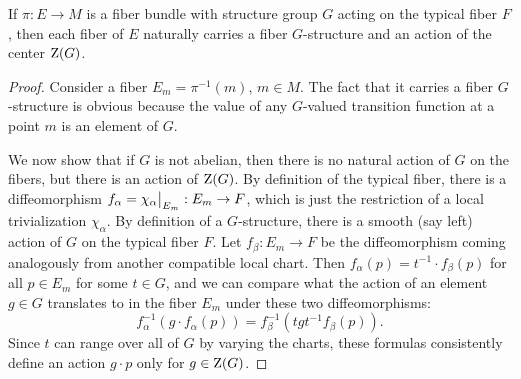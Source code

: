 \begin{prop}
    If $\pi:E\to M$ is a fiber bundle with structure group $G$ acting on the typical fiber $F$, then each fiber of $E$ naturally carries a fiber $G$-structure and an action of the center $\mathrm{Z}(G)$.
\end{prop}
\begin{proof}
    Consider a fiber $E_m=\pi^{-1}(m)$, $m\in M$. The fact that it carries a fiber $G$-structure is obvious because the value of any $G$-valued transition function at a point $m$ is an element of $G$. 
    
    We now show that if $G$ is not abelian, then there is no natural action of $G$ on the fibers, but there is an action of $\mathrm{Z}(G)$. By definition of the typical fiber, there is a diffeomorphism $f_\alpha=\restr{\chi_\alpha}{E_m}:E_m\to F$, which is just the restriction of a local trivialization $\chi_\alpha$. By definition of a $G$-structure, there is a smooth (say left) action of $G$ on the typical fiber $F$. Let $f_\beta:E_m\to F$ be the diffeomorphism coming analogously from another compatible local chart. Then $f_\alpha(p)=t^{-1}\cdot f_\beta(p)$ for all $p\in E_m$ for some $t\in G$, and we can compare what the action of an element $g\in G$ translates to in the fiber $E_m$ under these two diffeomorphisms:
    \[f_\alpha^{-1}(g\cdot f_\alpha(p))=f_\beta^{-1}(tgt^{-1} f_\beta(p)).\]
    Since $t$ can range over all of $G$ by varying the charts, these formulas consistently define an action $g\cdot p$ only for $g\in \mathrm{Z}(G)$.
\end{proof}

